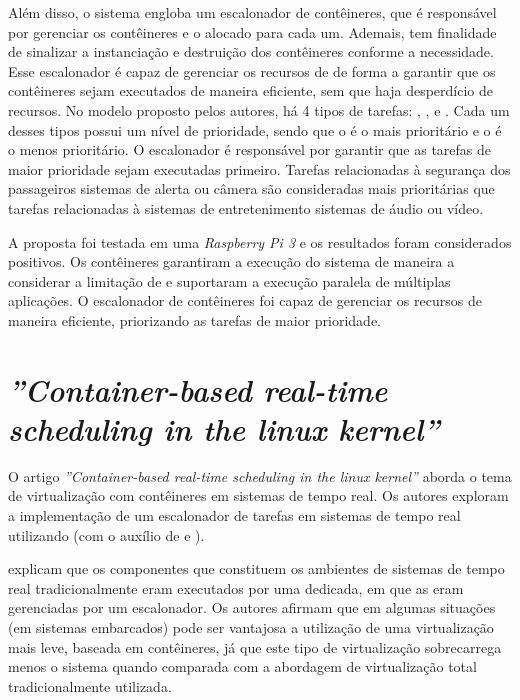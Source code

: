 Além disso, o sistema engloba um escalonador de contêineres, que é responsável por gerenciar os contêineres e o \hardware alocado para cada um. Ademais, tem finalidade de sinalizar a instanciação e destruição dos contêineres conforme a necessidade. Esse escalonador é capaz de gerenciar os recursos de \hardware de forma a garantir que os contêineres sejam executados de maneira eficiente, sem que haja desperdício de recursos. No modelo proposto pelos autores, há 4 tipos de tarefas: \critical, \high, \moderate e \low. Cada um desses tipos possui um nível de prioridade, sendo que o \critical é o mais prioritário e o \low é o menos prioritário. O escalonador é responsável por garantir que as tarefas de maior prioridade sejam executadas primeiro. Tarefas relacionadas à segurança dos passageiros \eg sistemas de alerta ou câmera são consideradas mais prioritárias que tarefas relacionadas à sistemas de entretenimento \eg sistemas de áudio ou vídeo.

A proposta foi testada em uma \textit{Raspberry Pi 3} e os resultados foram considerados positivos. Os contêineres garantiram a execução do sistema de maneira a considerar a limitação de \hardware e suportaram a execução paralela de múltiplas aplicações. O escalonador de contêineres foi capaz de gerenciar os recursos de maneira eficiente, priorizando as tarefas de maior prioridade.

\section{\textit{''Container-based real-time scheduling in the linux kernel''}}\label{sec.rw-4}

O artigo \textit{''Container-based real-time scheduling in the linux kernel''} \cite{abeni2019container} aborda o tema de virtualização com contêineres em sistemas de tempo real. Os autores exploram a implementação de um escalonador de tarefas em sistemas de tempo real utilizando \lxc (\ie com o auxílio de \cgroups e \namespaces). 

 explicam que os componentes que constituem os ambientes de sistemas de tempo real tradicionalmente eram executados por uma \vm dedicada, em que as \vms eram gerenciadas por um \hypervisor escalonador. Os autores afirmam que em algumas situações (\eg em sistemas embarcados) pode ser vantajosa a utilização de uma virtualização mais leve, baseada em contêineres, já que este tipo de virtualização sobrecarrega menos o sistema quando comparada com a abordagem de virtualização total tradicionalmente utilizada.

